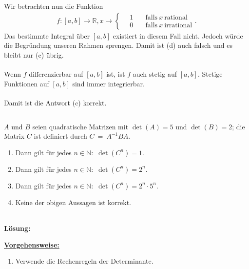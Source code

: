Wir betrachten nun die Funktion
\begin{align*}
f : [a,b] \to \mathbb{R},
x \mapsto 
\begin{cases}
\quad 1  &\quad \textrm{falls} \ x \ \textrm{rational}\\
 \quad 0  &\quad \textrm{falls} \ x \ \textrm{irrational}
\end{cases}.
\end{align*}
Das bestimmte Integral über $ [a,b] $ existiert in diesem Fall nicht.
Jedoch würde die Begründung unseren Rahmen sprengen.
Damit ist (d) auch falsch und es bleibt nur (c) übrig.\\
\\
Wenn $ f $ differenzierbar auf $ [a,b] $ ist, ist $ f $ auch stetig auf $ [a,b] $.
Stetige Funktionen auf $ [a,b] $ sind immer integrierbar.\\
\\
Damit ist die Antwort (c) korrekt.

\newpage

\subsection*{}
$A$ und $B$ seien quadratische Matrizen mit
$\det(A) = 5$ und $\det(B) = 2$; die Matrix $ C $ ist definiert durch 
$C \ = \ A^{-1}B A $. 
\renewcommand{\labelenumi}{(\alph{enumi})}
\begin{enumerate}
\item 
Dann gilt für jedes $ n \in \mathbb{N}: $ $ \det(C^n)  = 1$.
\item
Dann gilt für jedes $ n \in \mathbb{N}: $ $ \det(C^n)  = 2^n$.
\item
Dann gilt für jedes $ n \in \mathbb{N}: $ $ \det(C^n)  = 2^n \cdot 5^n$.
\item
Keine der obigen Aussagen ist korrekt.
\end{enumerate}
\ \\
\textbf{Lösung:}
\begin{mdframed}
\underline{\textbf{Vorgehensweise:}}
\renewcommand{\labelenumi}{\theenumi.}
\begin{enumerate}
\item Verwende die Rechenregeln der Determinante.
\end{enumerate}
\end{mdframed}

